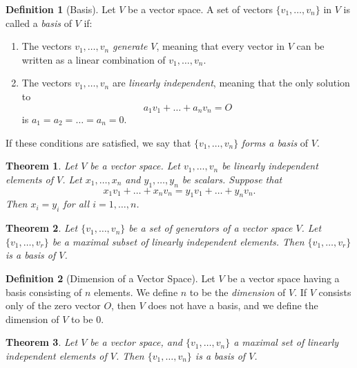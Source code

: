 \documentclass{article}
\newtheorem{theorem}{Theorem}[section]
\theoremstyle{definition}
\newtheorem{definition}{Definition}[section]
\theoremstyle{remark}
\begin{document}
\begin{definition}[Basis]
Let $V$ be a vector space. A set of vectors $\{ v_1, \dots, v_n \}$ in $V$ is called a \textit{basis} of $V$ if:
\begin{enumerate}
\item The vectors $v_1, \dots, v_n$ \textit{generate} $V$, meaning that every vector in $V$ can be written as a linear combination of $v_1, \dots, v_n$.
\item The vectors $v_1, \dots, v_n$ are \textit{linearly independent}, meaning that the only solution to 
\[
a_1 v_1 + \dots + a_n v_n = O
\]
is $a_1 = a_2 = \dots = a_n = 0$.
\end{enumerate}
If these conditions are satisfied, we say that $\{ v_1, \dots, v_n \}$ \textit{forms a basis} of $V$.
\end{definition}



\begin{theorem}
Let $V$ be a vector space. Let $v_1, \dots, v_n$ be linearly independent elements of $V$. Let $x_1, \dots, x_n$ and $y_1, \dots, y_n$ be scalars. Suppose that 
\[
x_1 v_1 + \dots + x_n v_n = y_1 v_1 + \dots + y_n v_n.
\]
Then $x_i = y_i$ for all $i = 1, \dots, n$.
\end{theorem}



\begin{theorem}
Let $\{ v_1, \dots, v_n \}$ be a set of generators of a vector space $V$. Let $\{ v_1, \dots, v_r \}$ be a maximal subset of linearly independent elements. Then $\{ v_1, \dots, v_r \}$ is a basis of $V$.
\end{theorem}





\begin{definition}[Dimension of a Vector Space]
Let $V$ be a vector space having a basis consisting of $n$ elements. We define $n$ to be the \textit{dimension} of $V$. If $V$ consists only of the zero vector $O$, then $V$ does not have a basis, and we define the dimension of $V$ to be $0$.
\end{definition}







\begin{theorem} \label{thm:maximal_independent_set}
Let \( V \) be a vector space, and \( \{ v_1, \dots, v_n \} \) a maximal set of linearly independent elements of \( V \). Then \( \{ v_1, \dots, v_n \} \) is a basis of \( V \).
\end{theorem}
\end{document}
